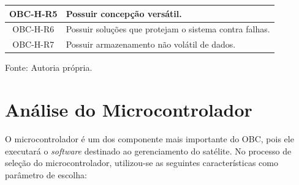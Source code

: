 \begin{table}[h]
{\begin{tabular}{@{}cl@{}}
			OBC-H-R5            & Possuir concepção versátil.                                                                                                                                                                                                                   \\ \hline
			OBC-H-R6            & Possuir soluções que protejam o sistema contra falhas.                                                                                                                                                                                        \\ \hline
			OBC-H-R7            & Possuir armazenamento não volátil de dados.                                                                                                                                                                                                   \\ \bottomrule
	\end{tabular}}
	\centering
\footnotesize{Fonte: Autoria própria.}

\end{table}

\section{Análise do Microcontrolador}

O microcontrolador é um dos componente mais importante do OBC, pois ele executará o \textit{software} destinado ao gerenciamento do satélite. No processo de seleção do microcontrolador, utilizou-se as seguintes características como parâmetro de escolha:


